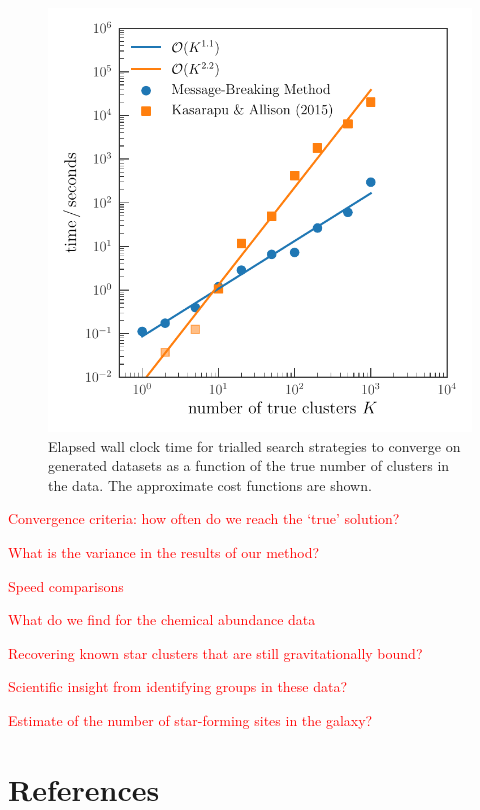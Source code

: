 \documentclass{elsarticle}
\newcommand{\todo}[1]{\textcolor{red}{#1}}
\begin{document}
\begin{figure}
    \includegraphics[width=1.0\textwidth]{cost.pdf}
    \caption{Elapsed wall clock time for trialled search strategies to converge 
             on generated datasets as a function of the true number of clusters
             in the data. The approximate cost functions are shown.}
    \label{fig:cost}
\end{figure}

\todo{Convergence criteria: how often do we reach the `true' solution?}

\todo{What is the variance in the results of our method?}

\todo{Speed comparisons}

\todo{What do we find for the chemical abundance data}

\todo{Recovering known star clusters that are still gravitationally bound?}

\todo{Scientific insight from identifying groups in these data?}

\todo{Estimate of the number of star-forming sites in the galaxy?}



\section{References}


\end{document}
